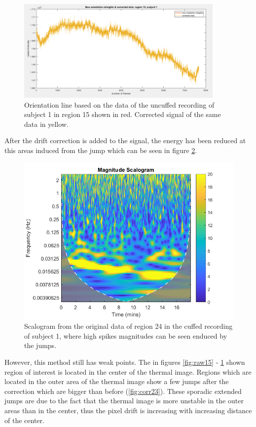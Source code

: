 \begin{figure}[H]
	\includegraphics[width=0.9\textwidth]{figures/corr15}
	\caption{Orientation line based on the data of the uncuffed recording of subject 1 in region 15 shown in red. Corrected signal of the same data in yellow.}
	\label{fig:corr15}
\end{figure}
After the drift correction is added to the signal, the energy has been reduced at this areas induced from the jump which can be seen in figure \ref{fig:scalogram_corr}. 
\begin{figure}[H]
	\includegraphics[width=1\textwidth]{figures/scalogram_uncorr}
	\caption{Scalogram from the original data of region 24 in the cuffed recording of subject 1, where high spikes magnitudes can be seen enduced by the jumps.}
	\label{fig:scalogram_corr}
\end{figure} 
However, this method still has weak points. The in figures \ref{fig:raw15} - \ref{fig:corr15} shown region of interest is located in the center of the thermal image. Regions which are located in the outer area of the thermal image show a few jumps after the correction which are bigger than before (\ref{fig:corr23}). These sporadic extended jumps are due to the fact that the thermal image is more unstable in the outer areas than in the center, thus the pixel drift is increasing with increasing distance of the center. 
